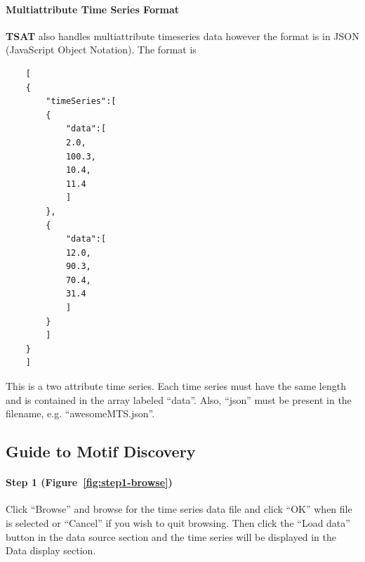 \documentclass[titlepage, letterpaper, 12pt]{article}
\newcommand\TSAT{\textbf{TSAT}}
\begin{document}
\paragraph{Multiattribute Time Series Format}

{\TSAT} also handles multiattribute timeseries data however the format is in JSON (JavaScript Object Notation).  The format is

\begin{verbatim}
	[
	{
		"timeSeries":[
		{
			"data":[
			2.0,
			100.3,
			10.4,
			11.4
			]
		},
		{
			"data":[
			12.0,
			90.3,
			70.4,
			31.4
			]
		}
		]
	}
	]
\end{verbatim}

This is a two attribute time series.  Each time series must have the same length and is contained in the array labeled ``data''.  Also, ``json'' must be present in the filename, e.g. ``awesomeMTS.json''.

\subsection{Guide to Motif Discovery}



\paragraph{Step 1 (Figure~\ref{fig:step1-browse})} Click ``Browse'' and browse for the time series data file and click ``OK'' when file is selected or ``Cancel'' if you wish to quit browsing.  Then click the ``Load data'' button in the data source section and the time series will be displayed in the Data display section.
\end{document}
